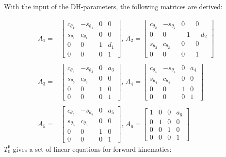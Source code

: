 \documentclass[11pt,a4paper, titlepage]{article}
\begin{document}
\begin{appendices}
With the input of the DH-parameters, the following matrices are derived:

\begin{equation*}
\begin{split}
A_{1} =
&\begin{bmatrix}
c_{\theta_1} & -s_{\theta_1} & 0 & 0 \\
s_{\theta_1} & c_{\theta_1} & 0 & 0 \\
0 & 0 & 1 & d_1 \\
0 & 0 & 0 & 1			 
\end{bmatrix},\,
A_{2} =
\begin{bmatrix}
c_{\theta_2} & -s_{\theta_2} & 0 & 0 \\
0 & 0 & -1 & -d_2 \\
s_{\theta_2} & c_{\theta_2} & 0 & 0 \\
0 & 0 & 0 & 1			 
\end{bmatrix} \\\\
A_{3} =
&\begin{bmatrix}
c_{\theta_3} & -s_{\theta_3} & 0 & a_3 \\
s_{\theta_3} & c_{\theta_3} & 0 & 0 \\
0 & 0 & 1 & 0 \\
0 & 0 & 0 & 1			 
\end{bmatrix},\,
A_{4} =
\begin{bmatrix}
c_{\theta_4} & -s_{\theta_4} & 0 & a_4 \\
s_{\theta_4} & c_{\theta_4} & 0 & 0 \\
0 & 0 & 1 & 0 \\
0 & 0 & 0 & 1			 
\end{bmatrix} \\\\
A_{5} =
&\begin{bmatrix}
c_{\theta_5} & -s_{\theta_5} & 0 & a_5 \\
s_{\theta_5} & c_{\theta_5} & 0 &0 \\
0 & 0 & 1 & 0 \\
0 & 0 & 0 & 1			 
\end{bmatrix},\,
A_{6} =
\begin{bmatrix}
1 & 0 & 0 & a_6 \\
0 & 1 & 0 & 0 \\
0 & 0 & 1 & 0 \\
0 & 0 & 0 & 1			 
\end{bmatrix}
\end{split}
\end{equation*}
\newpage
$T_0^6$ gives a set of linear equations for forward kinematics:


\end{appendices}
\end{document}
